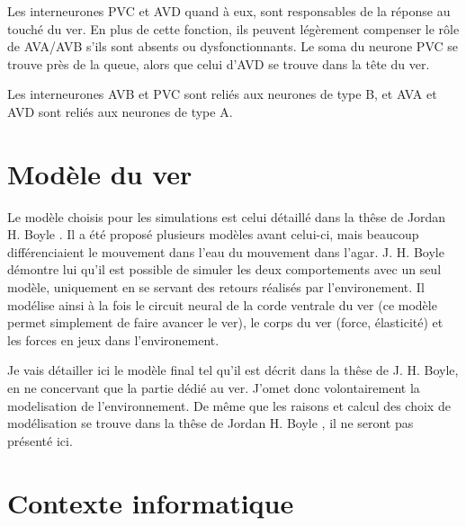 Les interneurones PVC et AVD quand à eux, sont responsables de la réponse au
touché du ver. En plus de cette fonction, ils peuvent légèrement compenser le
rôle de AVA/AVB s'ils sont absents ou dysfonctionnants. 
Le soma du neurone PVC se
trouve près de la queue, alors que celui d'AVD se trouve dans la tête du ver.

Les interneurones AVB et PVC sont reliés aux neurones de type B, et
AVA et AVD sont reliés aux neurones de type A.




\section{Modèle du ver} %
\label{sec:Modèle du ver}

Le modèle choisis pour les simulations est celui détaillé dans la thêse de
Jordan H. Boyle \cite{Boyle2009}. Il a été proposé plusieurs modèles avant
celui-ci, mais beaucoup différenciaient le mouvement dans l'eau du mouvement
dans l'agar. J. H. Boyle démontre lui qu'il est
possible de simuler les deux comportements avec un seul modèle, uniquement
en se servant des retours réalisés par l'environement. Il modélise ainsi à la
fois le circuit neural de la corde ventrale du ver (ce modèle permet simplement
de faire avancer le ver), le corps du ver (force, élasticité) et les forces
en jeux dans l'environement.

Je vais détailler ici le modèle final tel qu'il est décrit dans la thêse de J.
H. Boyle, en ne concervant que la partie dédié au ver. J'omet donc volontairement
la modelisation de l'environnement. De même que les raisons et calcul des choix
de modélisation se trouve dans la thêse de Jordan H. Boyle \cite{Boyle2009}, il
ne seront pas présenté ici.


\section{Contexte informatique} %
\label{sec:Contexte informatique}


